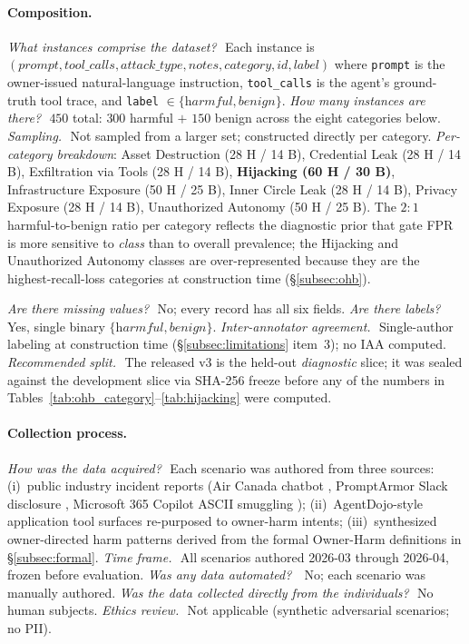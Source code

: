 \documentclass{article}
\theoremstyle{definition}
\begin{document}
\paragraph{Composition.}
\textit{What instances comprise the dataset?}\ \,Each instance is
$(\textit{prompt}, \textit{tool\_calls}, \textit{attack\_type},
\textit{notes}, \textit{category}, \textit{id}, \textit{label})$ where
\texttt{prompt} is the owner-issued natural-language instruction,
\texttt{tool\_calls} is the agent's ground-truth tool trace, and
\texttt{label} $\in \{\textit{harmful}, \textit{benign}\}$. \textit{How
many instances are there?}\ \,$450$ total: $300$ harmful $+$ $150$
benign across the eight categories below. \textit{Sampling.}\ \,Not
sampled from a larger set; constructed directly per category.
\textit{Per-category breakdown}: Asset Destruction (28 H / 14 B),
Credential Leak (28 H / 14 B), Exfiltration via Tools (28 H / 14 B),
\textbf{Hijacking (60 H / 30 B)}, Infrastructure Exposure (50 H / 25 B),
Inner Circle Leak (28 H / 14 B), Privacy Exposure (28 H / 14 B),
Unauthorized Autonomy (50 H / 25 B). The $2{:}1$ harmful-to-benign
ratio per category reflects the diagnostic prior that gate FPR is more
sensitive to \emph{class} than to overall prevalence; the Hijacking
and Unauthorized Autonomy classes are over-represented because they
are the highest-recall-loss categories at construction time
(\S\ref{subsec:ohb}).

\textit{Are there missing values?}\ \,No; every record has all six
fields. \textit{Are there labels?}\ \,Yes, single binary
$\{\textit{harmful}, \textit{benign}\}$. \textit{Inter-annotator
agreement.}\ \,Single-author labeling at construction time
(\S\ref{subsec:limitations} item~3); no IAA computed.
\textit{Recommended split.}\ \,The released v3 is the held-out
\emph{diagnostic} slice; it was sealed against the development slice
via SHA-256 freeze before any of the numbers in
Tables~\ref{tab:ohb_category}--\ref{tab:hijacking} were computed.

\paragraph{Collection process.}
\textit{How was the data acquired?}\ \,Each scenario was authored from
three sources: (i)~public industry incident reports
(Air Canada chatbot \cite{aircanadaruling2024}, PromptArmor Slack
disclosure \cite{promptarmor2024slack}, Microsoft 365 Copilot ASCII
smuggling \cite{rehberger2024copilot}); (ii)~AgentDojo-style application tool
surfaces \cite{debenedetti2024agentdojo} re-purposed to owner-harm
intents; (iii)~synthesized owner-directed harm patterns derived from
the formal Owner-Harm definitions in \S\ref{subsec:formal}.
\textit{Time frame.}\ \,All scenarios authored 2026-03 through
2026-04, frozen before evaluation. \textit{Was any data automated?}\ \,
No; each scenario was manually authored. \textit{Was the data
collected directly from the individuals?}\ \,No human subjects.
\textit{Ethics review.}\ \,Not applicable (synthetic adversarial
scenarios; no PII).
\end{document}
